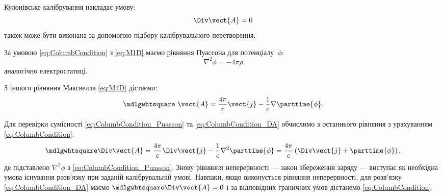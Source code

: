 Кулонівське калібрування накладає умову:
\begin{equation}\label{eq:ColumbCondition}
	\Div \vect{A} = 0
\end{equation}
також може бути виконана за допомогою підбору калібрувального
перетворення.

За умовою \eqref{eq:ColumbCondition} з \eqref{eq:M1D} маємо рівняння Пуассона для потенціалу~$\phi$:
\begin{equation}\label{eq:ColumbCondition_Puasson}
	\nabla^2 \phi = -4\pi \rho
\end{equation}
аналогічно електростатиці.

З іншого рівняння Максвелла \eqref{eq:M4D} дістаємо:
\begin{equation}\label{eq:ColumbCondition_DA}
	\mdlgwhtsquare\ \vect{A} = \frac{4\pi}c \vect{j} - \frac1c \nabla \parttime{\phi}.
\end{equation}

Для перевірки сумісності \eqref{eq:ColumbCondition_Puasson} та \eqref{eq:ColumbCondition_DA} обчислимо з останнього рівняння з
урахуванням \eqref{eq:ColumbCondition}:
\begin{equation*}
	\mdlgwhtsquare\Div\vect{A} = \frac{4\pi}c \Div\vect{j} - \frac1c \nabla^2 \parttime{\phi} = \frac{4\pi}c\left( \Div\vect{j} +
	\parttime{\phi}\right),
\end{equation*}
де підставлено $\nabla^2\phi$ з \eqref{eq:ColumbCondition_Puasson}. Знову рівняння неперервності --- закон збереження
заряду --- виступає як необхідна умова існування розв’язку при заданій
калібрувальній умові. Навпаки, якщо виконується рівняння неперервності, для
розв’язку \eqref{eq:ColumbCondition_DA} маємо $\mdlgwhtsquare\Div\vect{A} = 0$ і за відповідних граничних умов
дістанемо \eqref{eq:ColumbCondition}.


